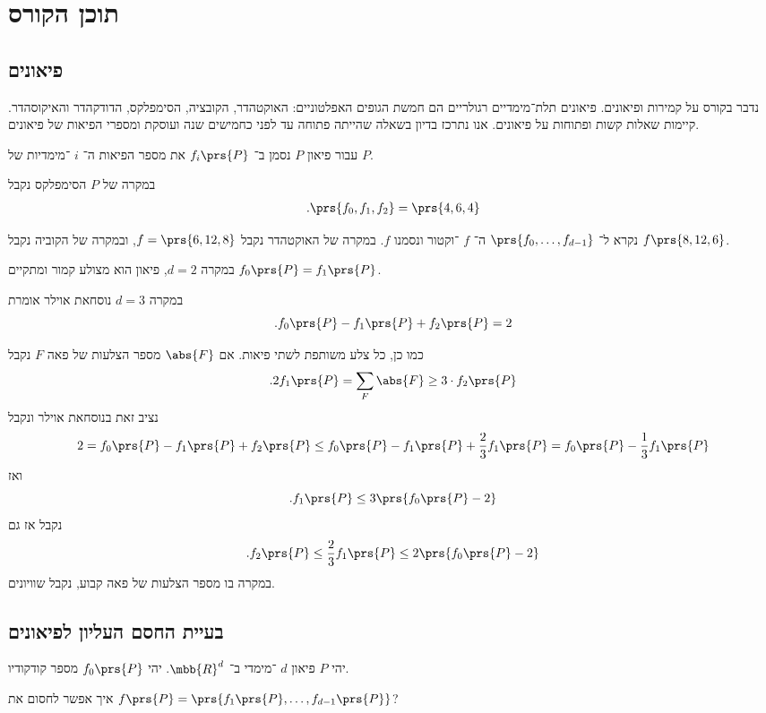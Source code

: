 \documentclass[a4paper,10pt,twoside,openany]{book}
\begin{document}
\section{תוכן הקורס}

\subsection{פיאונים}

נדבר בקורס על קמירות ופיאונים.
פיאונים תלת־מימדיים רגולריים הם חמשת הגופים האפלטוניים: האוקטהדר, הקובציה, הסימפלקס, הדודקהדר והאיקוסהדר.
קיימות שאלות קשות ופתוחות על פיאונים. אנו נתרכז בדיון בשאלה שהייתה פתוחה עד לפני כחמישים שנה ועוסקת ומספרי הפיאות של פיאונים.

עבור פיאון
$P$
נסמן ב־%
$f_i\prs{P}$
את מספר הפיאות ה־%
$i$%
־מימדיות של
$P$.

במקרה של
$P$
הסימפלקס נקבל
\begin{align*}
\text{.} \prs{f_0, f_1, f_2} = \prs{4,6,4}
\end{align*}

נקרא ל־%
$\prs{f_0, \ldots, f_{d-1}}$
ה־%
$f$%
־וקטור ונסמנו
$f$.
במקרה של האוקטהדר נקבל
$f = \prs{6,12,8}$,
ובמקרה של הקוביה נקבל
$f\prs{8,12,6}$.

במקרה
$d = 2$,
פיאון הוא מצולע קמור ומתקיים
$f_0\prs{P} = f_1\prs{P}$.

במקרה
$d = 3$
נוסחאת אוילר אומרת
\[\text{.} f_0\prs{P} - f_1\prs{P} + f_2\prs{P} = 2\]

כמו כן, כל צלע משותפת לשתי פיאות. אם
$\abs{F}$
מספר הצלעות של פאה
$F$
נקבל
\begin{align*}
\text{.} 2 f_1\prs{P} = \sum_{F} \abs{F} \geq 3 \cdot f_2\prs{P}
\end{align*}
נציב זאת בנוסחאת אוילר ונקבל
\[2 = f_0\prs{P} - f_1\prs{P} + f_2\prs{P} \leq f_0\prs{P} - f_1\prs{P} + \frac{2}{3} f_1\prs{P} = f_0\prs{P} - \frac{1}{3} f_1\prs{P}\]
ואז
\[\text{.} f_1\prs{P} \leq 3 \prs{f_0\prs{P} - 2}\]
נקבל אז גם
\[\text{.} f_2\prs{P} \leq \frac{2}{3} f_1\prs{P} \leq 2 \prs{f_0\prs{P} - 2}\]
במקרה בו מספר הצלעות של פאה קבוע, נקבל שוויונים.

\subsection{בעיית החסם העליון לפיאונים}

יהי
$P$
פיאון
$d$%
־מימדי ב־%
$\mbb{R}^d$.
יהי
$f_0\prs{P}$
מספר קודקודיו.

\begin{question}
איך אפשר לחסום את
$f\prs{P} = \prs{f_1\prs{P}, \ldots, f_{d-1}\prs{P}}$?
\end{question}
\end{document}
